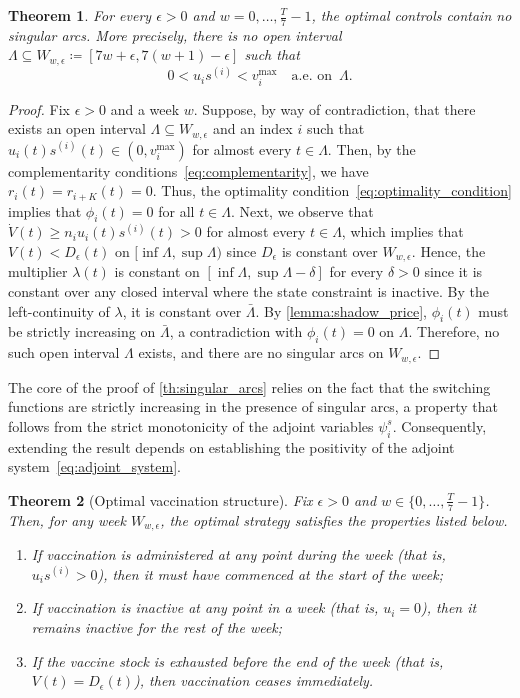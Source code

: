 \documentclass[letterpaper, 10 pt, conference]{ieeeconf}
\newtheorem{theorem}{Theorem}
\begin{document}
\begin{theorem}
    \label{th:singular_arcs}
    For every $\epsilon > 0$ and \(w = 0, \dots, \frac{T}{7}-1\), the optimal controls contain no singular arcs. 
    More precisely,  there is no open interval \(\Lambda \subseteq W_{w,\epsilon} \coloneqq [7w+\epsilon, 7(w+1)-\epsilon]\) such that
    \[
    0 < u_i s^{(i)} < v_i^{\max}\quad \text{a.e. on }\, \Lambda.
    \]
\end{theorem}
\vspace{0.2cm}
\begin{proof}
    Fix $\epsilon > 0$ and a week $w$.
    Suppose, by way of contradiction, that there exists an open interval $\Lambda \subseteq W_{w,\epsilon}$ and an index $i$ such that $u_i(t) s^{(i)}(t) \in (0, v_i^{\max})$ for almost every $t \in \Lambda$.
    Then, by the complementarity conditions~\eqref{eq:complementarity}, we have $r_i(t) = r_{i+K}(t) = 0$.
    Thus, the optimality condition~\eqref{eq:optimality_condition} implies that $\phi_i(t) = 0$ for all $t \in \Lambda$.
    Next, we observe that $\dot{V}(t) \ge n_i u_i(t) s^{(i)}(t) > 0$ for almost every $t \in \Lambda$, which implies that $V(t) < D_{\epsilon}(t)$ on $[\inf \Lambda, \sup \Lambda)$ since $D_{\epsilon}$ is constant over $W_{w,\epsilon}$.
    Hence, the multiplier $\lambda(t)$ is constant on $[\inf \Lambda, \sup \Lambda - \delta]$ for every $\delta > 0$ since it is constant over any closed interval where the state constraint is inactive.
    By the left-continuity of $\lambda$, it is constant over $\bar{\Lambda}$. 
    By \autoref{lemma:shadow_price}, $\phi_i(t)$ must be strictly increasing on $\bar{\Lambda}$, a contradiction with $\phi_i(t) = 0$ on $\Lambda$.
    Therefore, no such open interval $\Lambda$ exists, and there are no singular arcs on $W_{w,\epsilon}$.
\end{proof}

The core of the proof of \autoref{th:singular_arcs} relies on the fact that the switching functions are strictly increasing in the presence of singular arcs, a property that follows from the strict monotonicity of the adjoint variables $\psi_i^s$.
Consequently, extending the result depends on establishing the positivity of the adjoint system~\eqref{eq:adjoint_system}.

\begin{theorem}[Optimal vaccination structure]\label{th:optimal_vaccination}
    Fix \(\epsilon>0\) and \(w\in\{0,\dots,\frac{T}{7}-1\}\).
    Then, for any week $W_{w,\epsilon}$, the optimal strategy satisfies the properties listed below.
    \begin{enumerate}
        \item If vaccination is administered at any point during the week (that is, $u_i s^{(i)} > 0$), then it must have commenced at the start of the week;
        \item If vaccination is inactive at any point in a week (that is, $u_i = 0$), then it remains inactive for the rest of the week;
        \item If the vaccine stock is exhausted before the end of the week (that is, \( V(t) = D_{\epsilon}(t) \)), then vaccination ceases immediately.
    \end{enumerate}
\end{theorem}
\end{document}
